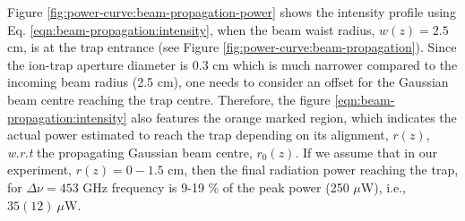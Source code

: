 Figure \ref{fig:power-curve:beam-propagation-power} shows the intensity profile
using Eq. \ref{eqn:beam-propagation:intensity}, when the beam waist radius,
$w(z)=2.5$ cm, is at the trap entrance (see Figure
\ref{fig:power-curve:beam-propagation}). Since the ion-trap aperture diameter
is 0.3 cm which is much narrower compared to the incoming beam radius (2.5 cm),
one needs to consider an offset for the Gaussian beam centre reaching the trap
centre. Therefore, the figure \ref{eqn:beam-propagation:intensity} also
features the orange marked region, which indicates the actual power estimated
to reach the trap depending on its alignment, $r(z)$, \emph{w.r.t} the
propagating Gaussian beam centre, $r_0(z)$. If we assume that in our
experiment, $r(z)=0-1.5$ cm, then the final radiation power reaching the trap,
for $\Delta \nu=453$ GHz frequency is 9-19 \% of the peak power (250 $\mu$W),
i.e., $35(12)\ \mu$W.

